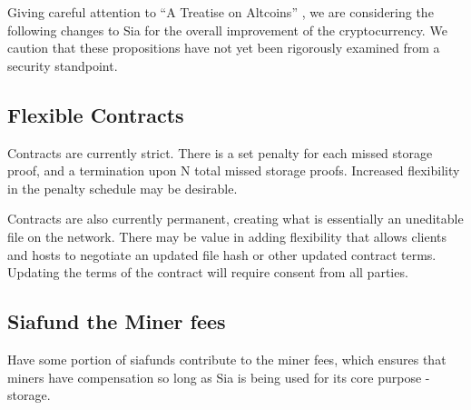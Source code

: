 \documentclass[twocolumn]{article}
\begin{document}
Giving careful attention to ``A Treatise on Altcoins'' \cite{alts}, we are considering the following changes to Sia for the overall improvement of the cryptocurrency.
We caution that these propositions have not yet been rigorously examined from a security standpoint.

\subsection{Flexible Contracts}
Contracts are currently strict.
There is a set penalty for each missed storage proof, and a termination upon N total missed storage proofs.
Increased flexibility in the penalty schedule may be desirable.

Contracts are also currently permanent, creating what is essentially an uneditable file on the network.
There may be value in adding flexibility that allows clients and hosts to negotiate an updated file hash or other updated contract terms.
Updating the terms of the contract will require consent from all parties.




\subsection{Siafund the Miner fees}
Have some portion of siafunds contribute to the miner fees, which ensures that miners have compensation so long as Sia is being used for its core purpose - storage.
\end{document}
